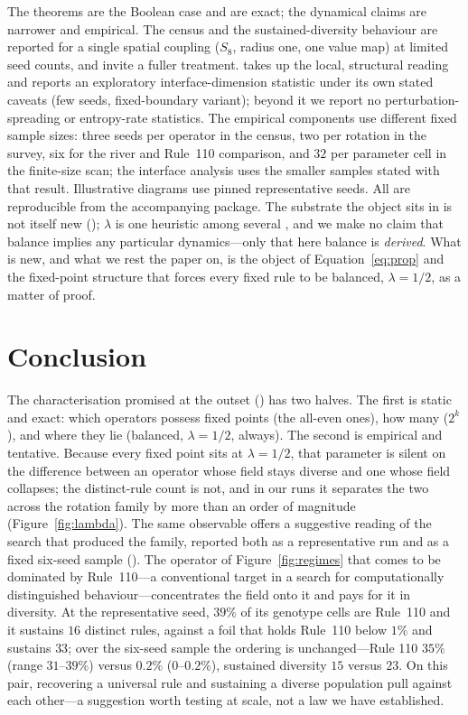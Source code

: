 \documentclass[man,12pt,floatsintext,donotrepeattitle]{apa7}
\newcommand{\secref}[1]{\emph{\nameref{#1}}}
\begin{document}
The theorems are the Boolean case and are exact; the dynamical claims are
narrower and empirical. The census and the sustained-diversity behaviour are
reported for a single spatial coupling ($S_8$, radius one, one value map) at
limited seed counts, and invite a fuller treatment. \secref{sec:discussion}
takes up the local, structural reading and reports an exploratory
interface-dimension statistic under its own stated caveats (few seeds,
fixed-boundary variant); beyond it we report no perturbation-spreading or
entropy-rate statistics.
The empirical components use different fixed sample sizes: three seeds per
operator in the census, two per rotation in the survey, six for the river and
Rule~110 comparison, and $32$ per parameter cell in the finite-size scan; the
interface analysis uses the smaller samples stated with that result.
Illustrative diagrams use pinned representative seeds. All are reproducible
from the accompanying package. The
substrate the object sits in is not itself new (\secref{sec:object}); $\lambda$
is one heuristic among several \parencite{wuensche1999classifying}, and we
make no claim that balance implies any particular dynamics---only that here
balance is \emph{derived}. What is new, and what we rest the paper on, is the
object of Equation~\eqref{eq:prop} and the fixed-point structure that forces
every fixed rule to be balanced, $\lambda = 1/2$, as a matter of proof.

\section{Conclusion}
\label{sec:conclusion}

The characterisation promised at the outset (\secref{sec:object}) has two
halves. The
first is static and exact: which operators possess fixed points (the
all-even ones), how many ($2^k$), and where they lie (balanced,
$\lambda = 1/2$, always). The second is empirical and tentative. Because
every fixed point sits at $\lambda = 1/2$, that parameter is silent on the
difference between an operator whose field stays diverse and one whose field
collapses; the distinct-rule count is not, and in our
runs it separates the two across the rotation family by more than an order of
magnitude (Figure~\ref{fig:lambda}). The same observable offers a suggestive
reading of the search that produced the family, reported both as a
representative run and as a fixed six-seed sample (\secref{sec:limits}). The
operator of Figure~\ref{fig:regimes} that comes to be dominated by
Rule~110---a conventional target in a search for computationally distinguished
behaviour---concentrates the field onto it and pays for it in diversity.
At the representative seed, $39\%$ of its genotype cells are Rule~110 and it
sustains $16$ distinct rules, against a foil that holds Rule~110 below $1\%$
and sustains $33$; over the six-seed sample the ordering is unchanged---Rule
110 $35\%$ (range $31$--$39\%$) versus $0.2\%$ ($0$--$0.2\%$), sustained diversity
$15$ versus $23$. On this pair, recovering a universal rule and sustaining a
diverse population pull against each other---a suggestion worth testing at
scale, not a law we have established.
\end{document}
